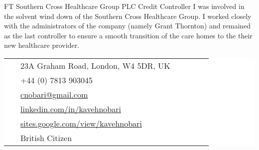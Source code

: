 \documentclass[10pt]{article} %
\begin{document}
\begin{paracol}{2}
{FT} %
{Southern Cross Healthcare Group PLC} %
{Credit Controller} %
{I was involved in the solvent wind down of the Southern Cross Health\-care Group. I worked closely with the administrators of the company (namely Grant Thornton) and remained as the last contro\-ller to ensure a smooth transition of the care homes to the their new healthcare provider.} %

\vspace{-\baselineskip}\medskip %

\switchcolumn %


\parbox[top][0.12\textheight][c]{\linewidth}{ %
	\vspace{-0.04\textheight} %
	\colorbox{white}{ %
		\begin{supertabular}{p{0.05\linewidth}|p{0.775\linewidth}} %
			\raisebox{-1pt}{\faHome} & 23A Graham Road, London, W4 5DR, UK \\ %
			\raisebox{-1pt}{\faPhone} & +44 (0) 7813 903045 \\ %
			\raisebox{0pt}{\small\faEnvelope} & \href{mailto: cnobari@gmail.com}{cnobari@gmail.com} \\ %
			\raisebox{-1pt}{\small\faLinkedinSquare} & \href{https://www.linkedin.com/in/kavehnobari}{linkedin.com/in/kavehnobari} \\ %
			\raisebox{-1pt}{\small\faGlobe} &  \href{https://sites.google.com/view/kavehnobari}{sites.google.com/view/kavehnobari}  \\ %
			\raisebox{-1pt}{\small\faFlag} & British Citizen \\ %
		\end{supertabular}
	}
}


\end{paracol}
\end{document}
